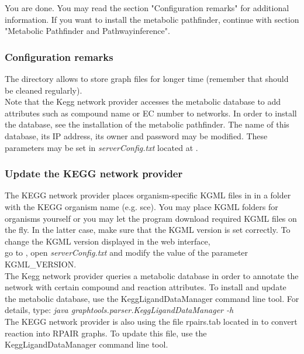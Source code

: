 \documentclass{book}
\begin{document}
You are done. You may read the section "Configuration remarks" for additional information.
If you want to install the metabolic pathfinder, continue with section "Metabolic Pathfinder and Pathwayinference".

\subsubsection{Configuration remarks}

The directory 
allows to store graph files for longer time
(remember that  should be cleaned regularly).\\

Note that the Kegg network provider accesses the metabolic database to add attributes
such as compound name or EC number to networks.
In order to install the database, see the installation of the metabolic pathfinder.
The name of this database, its IP address, its owner and password may be modified.
These parameters may be set in \textit{serverConfig.txt}
located at .

\subsubsection{Update the KEGG network provider}

The KEGG network provider places organism-specific KGML files in 
in a folder with the KEGG organism name (e.g. sce).
You may place KGML folders for organisms yourself or you may let the program download
required KGML files on the fly. In the latter case, make sure that the KGML version is set correctly.
To change the KGML version displayed in the web interface,\\
go to , open
\textit{serverConfig.txt} and modify the value of the parameter KGML\_VERSION.\\

The Kegg network provider queries a metabolic database in order to annotate the network
with certain compound and reaction attributes.
To install and update the metabolic database, use the KeggLigandDataManager command line tool.
For details, type:
\textit{java graphtools.parser.KeggLigandDataManager -h}\\

The KEGG network provider is also using the file rpairs.tab located in 
to convert reaction into RPAIR graphs. To update this file, use the KeggLigandDataManager command line tool.\\
\end{document}
